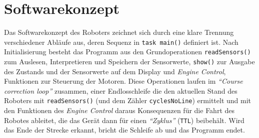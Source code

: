 \section{Softwarekonzept}

Das Softwarekonzept des Roboters zeichnet sich durch eine klare Trennung verschiedener Abläufe aus, deren Sequenz in \texttt{task main()} definiert ist. Nach Initialisierung besteht das Programm aus den Grundoperationen \texttt{readSensors()} zum Auslesen, Interpretieren und Speichern der Sensorwerte, \texttt{show()} zur Ausgabe des Zustands und der Sensorwerte auf dem Display und \textit{Engine Control}, Funktionen zur Steuerung der Motoren. Diese Operationen laufen im \textit{\enquote{Course correction loop}} zusammen, einer Endlosschleife die den aktuellen Stand des Roboters mit \texttt{readSensors()} (und dem Zähler \texttt{cyclesNoLine}) ermittelt und mit den Funktionen des \textit{Engine Control} daraus Konsequenzen für die Fahrt des Robotes ableitet, die das Gerät dann für einen \textit{\enquote{Zyklus}} (\texttt{TTL}) beibehält. Wird das Ende der Strecke erkannt, bricht die Schleife ab und das Programm endet.
